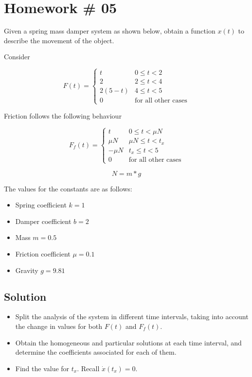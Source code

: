 \section{Homework \# 05}

Given a spring mass damper system as shown below, obtain a function $x(t)$ to describe the movement of the object.

Consider 

\begin{equation}
F(t) = \begin{cases} 
      t &  0 \leq t < 2  \\
      2 & 2 \leq t < 4 \\
      2(5-t) & 4 \leq t < 5 \\
      0 & \text{for all other cases}
   \end{cases}
\end{equation}

Friction follows the following behaviour

\begin{equation}
F_f (t) = \begin{cases} 
      t &  0 \leq t < \mu N  \\
      \mu N & \mu N \leq t < t_x \\
      -\mu N & t_x \leq t < 5 \\
      0 & \text{for all other cases}
   \end{cases}
\end{equation}

\begin{equation*}   
N = m*g
\end{equation*}


The values for the constants are as follows:

\begin{itemize}
 \item Spring coefficient $k = 1$
 \item Damper coefficient $b = 2$
 \item Mass $m = 0.5$
 \item Friction coefficient $\mu = 0.1$
 \item Gravity $g = 9.81$
\end{itemize}

\subsection{Solution}
 
\begin{itemize}
 \item Split the analysis of the system in different time intervals, taking into account the change in values for both $F(t)$ and $F_f (t)$.
 \item Obtain the homogeneous and particular solutions at each time interval, and determine the coefficients associated for each of them.
 \item  Find the value for $t_x$. Recall $\dot{x}(t_x)=0$.
\end{itemize}


